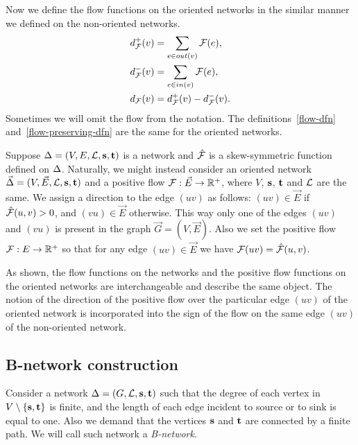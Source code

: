 \documentclass[12pt]{amsart}
\begin{document}
    Now we define the flow functions on the oriented networks in the similar manner we defined on the non-oriented networks.
    \begin{align*}
      &d^{+}_{\mathcal{F}}(v) = \sum_{e \in out(v)} \mathcal{F}(e),\\
      &d^{-}_{\mathcal{F}}(v) = \sum_{e \in in(v)} \mathcal{F}(e),\\
      &d_{\mathcal{F}}(v) = d^{+}_{\mathcal{F}}(v) - d^{-}_{\mathcal{F}}(v).
    \end{align*}
    Sometimes we will omit the flow from the notation.
    The definitions~\ref{flow-dfn} and~\ref{flow-preserving-dfn} are the same for the oriented networks.
    \bigskip

    Suppose $\Delta = (V, E, \mathcal{L}, \mathbf{s}, \mathbf{t})$ is a network and $\mathcal{\hat{F}}$ is a skew-symmetric function defined
      on $\Delta$.
    Naturally, we might instead consider an oriented network $\vec{\Delta} = (V, \vec{E}, \mathcal{L}, \mathbf{s}, \mathbf{t})$ and a
      positive flow $\mathcal{F}: \vec{E} \to \mathbb{R}^{+}$, where $V$, $\mathbf{s}$, $\mathbf{t}$ and $\mathcal{L}$ are the same.
    We assign a direction to the edge $(uv)$ as follows:
      $(uv) \in \vec{E}$ if $\mathcal{\hat{F}}(u, v) > 0$, and $(vu) \in \vec{E}$ otherwise.
    This way only one of the edges $(uv)$ and $(vu)$ is present in the graph $\vec{G} = (V, \vec{E})$.
    Also we set the positive flow $\mathcal{F}: E \to \mathbb{R}^{+}$ so that
      for any edge $(uv) \in \vec{E}$ we have $\mathcal{F}(u v) = \mathcal{\hat{F}}(u,v)$.
    \begin{remark}
      As shown, the flow functions on the networks and the positive flow functions on the oriented networks
        are interchangeable and describe the same object.
      The notion of the direction of the positive flow over the particular edge $(uv)$ of the oriented network
        is incorporated into the sign of the flow on the same edge $(uv)$ of the non-oriented network.
    \end{remark}

    \subsection{B-network construction}
    \begin{definition}
      Consider a network $\Delta = (G, \mathcal{L}, \mathbf{s}, \mathbf{t})$ such that
        the degree of each vertex in $V \setminus \{\mathbf{s}, \mathbf{t}\} $ is finite,
        and the length of each edge incident to source or to sink is equal to one.
      Also we demand that the vertices $\mathbf{s}$ and $\mathbf{t}$ are connected by a finite path.
      We will call such network a \emph{B-network}.
    \end{definition}
\end{document}
